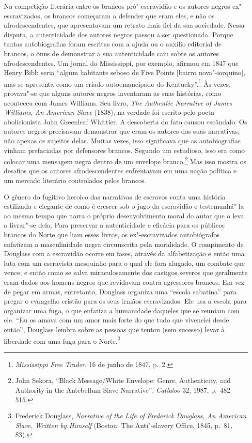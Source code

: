 Na competição literária entre os brancos pró"-escravidão e os autores
negros ex"-escravizados, os brancos começaram a defender que eram eles, e
não os afrodescendentes, que apresentavam um retrato mais fiel da sua
sociedade. Nessa disputa, a autenticidade dos autores negros passou a
ser questionada. Porque tantas autobiografias foram
escritas com a ajuda ou o auxílio editorial de brancos, o ônus de
demonstrar a sua autenticidade caiu sobre os autores afrodescendentes.
Um jornal do Mississippi, por exemplo, afirmou em 1847 que Henry Bibb
seria ``algum habitante seboso de Five Points {[}bairro
nova"-iorquino{]}, mas se apresenta como um criado autoemancipado do
Kentucky''.\footnote{\emph{Mississippi Free Trader}, 16 de junho de 1847,
  p.~2.} Às vezes, provava"-se que alguns autores negros inventaram as suas
histórias, como aconteceu com James Williams. Seu livro, \emph{The
Authentic Narrative of James Williams, An American Slave} (1838), na
verdade foi escrito pelo poeta abolicionista John Greenleaf Whittier. A
descoberta do fato causou escândalo. Os autores negros precisavam
demonstrar que eram os autores das suas narrativas, não apenas os
sujeitos delas. Muitas vezes, isso significava que as autobiografias
vinham prefaciadas por defensores brancos. Segundo um estudioso, isso
era como colocar uma mensagem negra dentro de um envelope
branco.\footnote{John Sekora, ``Black Message/White Envelope: Genre,
  Authenticity, and Authority in the Antebellum Slave Narrative'',
  \emph{Callaloo} 32, 1987, p.~482--515.} Mas isso mostra os desafios que
os autores afrodescendentes enfrentavam em uma nação política e um
mercado literário controlados pelos brancos.

O gênero do fugitivo heroico das narrativas de escravos conta uma
história estilizada e elegante de como é crescer sob o jugo da
escravidão e testemunhá"-la ao mesmo tempo que narra o próprio
desenvolvimento moral do autor que o leva a livrar"-se dela. Para
preservar a autenticidade e eficácia para os públicos brancos do Norte
que liam esses livros, os ex"-escravizados autobiógrafos enfatizam a
masculinidade negra circunscrita pela moralidade. O rompimento de
Douglass com a escravidão ocorre em fases, através da alfabetização e
então uma luta com um escravista mesquinho para o qual ele fora alugado,
um combate que vence, e então como se salva miraculosamente dos castigos
severos que geralmente eram dados aos homens negros que revidavam contra
agressores brancos. Em vez de pegar em armas, entretanto, Douglass
organiza uma ``escola sabatina'' para pregar o evangelho cristão para os
seus irmãos escravizados. Ele usa a escola para organizar uma fuga, o
que enfatiza a humanidade daqueles que se reuniam com ele. ``Eu os amava
com um amor mais forte do que tudo que vivenciei desde então'', Douglass
lembra sobre as pessoas que tentou (sem sucesso) levar à liberdade com
uma fuga para o Norte.\footnote{Frederick Douglass, \emph{Narrative of
  the Life of Frederick Douglass, An American Slave, Written by Himself}
  (Boston: The Anti"-slavery Office, 1845, p.~81, 83).}


\pagebreak
\thispagestyle{empty}